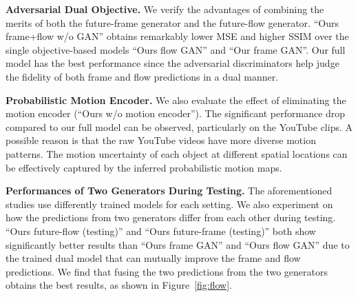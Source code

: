 \documentclass[10pt,twocolumn,letterpaper]{article}
\begin{document}
	\textbf{Adversarial Dual Objective.} We verify the advantages of combining the merits of both the future-frame generator and the future-flow generator. ``Ours frame+flow w/o GAN'' obtains remarkably lower MSE and higher SSIM over the single objective-based models ``Ours flow GAN'' and ``Our frame GAN''. Our full model has the best performance since the adversarial discriminators help judge the fidelity of both frame and flow predictions in a dual manner.
	
	\textbf{Probabilistic Motion Encoder.} We also evaluate the effect of eliminating the motion encoder (``Ours w/o motion encoder''). The significant performance drop compared to our full model can be observed, particularly on the YouTube clips. A possible reason is that the raw YouTube videos have more diverse motion patterns. The motion uncertainty of each object at different spatial locations can be effectively captured by the inferred probabilistic motion maps.
	
	\textbf{Performances of Two Generators During Testing.} The aforementioned studies use differently trained models for each setting. We also experiment on how the predictions from two generators differ from each other during testing. ``Ours future-flow (testing)'' and ``Ours future-frame (testing)'' both show significantly better results than ``Ours frame GAN'' and ``Ours flow GAN'' due to the trained dual model that can mutually improve the frame and flow predictions. We find that fusing the two predictions from the two generators obtains the best results, as shown in Figure~\ref{fig:flow}.
	
\end{document}
